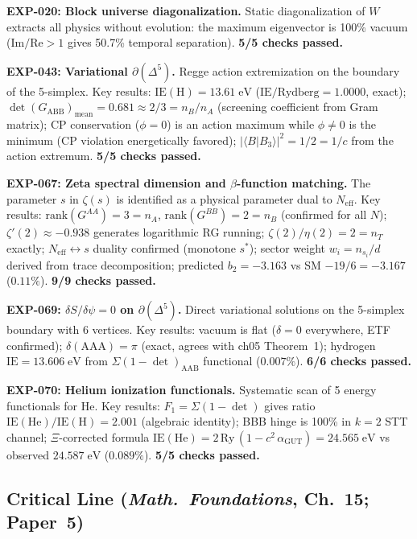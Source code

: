 \textbf{EXP-020: Block universe diagonalization.} Static diagonalization of $W$ extracts all physics without evolution: the maximum eigenvector is 100\% vacuum ($\text{Im}/\text{Re} > 1$ gives 50.7\% temporal separation). \textbf{5/5 checks passed.}

\textbf{EXP-043: Variational $\partial(\Delta^5)$.}  Regge action extremization on the boundary of the 5-simplex. Key results: $\text{IE}(\text{H}) = 13.61\;\text{eV}$ ($\text{IE}/\text{Rydberg} = 1.0000$, exact); $\det(G_\text{ABB})_\text{mean} = 0.681 \approx 2/3 = n_B/n_A$ (screening coefficient from Gram matrix); CP conservation ($\phi = 0$) is an action maximum while $\phi \neq 0$ is the minimum (CP violation energetically favored); $|\langle B|B_3\rangle|^2 = 1/2 = 1/c$ from the action extremum. \textbf{5/5 checks passed.}

\textbf{EXP-067: Zeta spectral dimension and $\beta$-function matching.}  The parameter $s$ in $\zeta(s)$ is identified as a physical parameter dual to $N_\text{eff}$. Key results: $\text{rank}(G^{AA}) = 3 = n_A$, $\text{rank}(G^{BB}) = 2 = n_B$ (confirmed for all $N$); $\zeta'(2) \approx -0.938$ generates logarithmic RG running; $\zeta(2)/\eta(2) = 2 = n_T$ exactly; $N_\text{eff} \leftrightarrow s$ duality confirmed (monotone $s^*$); sector weight $w_i = n_{s_i}/d$ derived from trace decomposition; predicted $b_2 = -3.163$ vs SM $-19/6 = -3.167$ ($0.11\%$). \textbf{9/9 checks passed.}

\textbf{EXP-069: $\delta S/\delta\psi = 0$ on $\partial(\Delta^5)$.}  Direct variational solutions on the 5-simplex boundary with 6 vertices. Key results: vacuum is flat ($\delta = 0$ everywhere, ETF confirmed); $\delta(\text{AAA}) = \pi$ (exact, agrees with ch05 Theorem~1); hydrogen $\text{IE} = 13.606\;\text{eV}$ from $\Sigma(1-\det)_\text{AAB}$ functional ($0.007\%$). \textbf{6/6 checks passed.}

\textbf{EXP-070: Helium ionization functionals.}  Systematic scan of 5 energy functionals for He. Key results: $F_1 = \Sigma(1-\det)$ gives ratio $\text{IE}(\text{He})/\text{IE}(\text{H}) = 2.001$ (algebraic identity); BBB hinge is 100\% in $k=2$ STT channel; $\Xi$-corrected formula $\text{IE}(\text{He}) = 2\,\text{Ry}\,(1 - c^2\,\alpha_\text{GUT}) = 24.565\;\text{eV}$ vs observed $24.587\;\text{eV}$ ($0.089\%$). \textbf{5/5 checks passed.}

\subsection{Critical Line (\textit{Math.~Foundations}, Ch.~15; Paper~5)}

